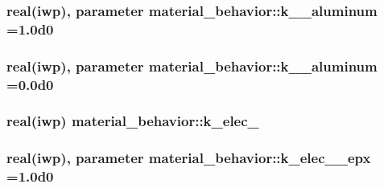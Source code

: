 \subsubsection[{k\+\_\+00\+\_\+aluminum}]{\setlength{\rightskip}{0pt plus 5cm}real(iwp), parameter material\+\_\+behavior\+::k\+\_\+\_\+aluminum =1.\+0d0}\label{classmaterial__behavior_a87bcf8ea95320967838eb79ea1185bcf}
\hypertarget{classmaterial__behavior_a3258f4bdb606bd94c11a8e59317d271d}{}
\subsubsection[{k\+\_\+01\+\_\+aluminum}]{\setlength{\rightskip}{0pt plus 5cm}real(iwp), parameter material\+\_\+behavior\+::k\+\_\+\_\+aluminum =0.\+0d0}\label{classmaterial__behavior_a3258f4bdb606bd94c11a8e59317d271d}
\hypertarget{classmaterial__behavior_a73beea5a2807ab8f6e15b990b7592486}{}
\subsubsection[{k\+\_\+elec\+\_\+00}]{\setlength{\rightskip}{0pt plus 5cm}real(iwp) material\+\_\+behavior\+::k\+\_\+elec\+\_}\label{classmaterial__behavior_a73beea5a2807ab8f6e15b990b7592486}
\hypertarget{classmaterial__behavior_ae6627960fae7dc38934722c9097db8e1}{}
\subsubsection[{k\+\_\+elec\+\_\+00\+\_\+epx}]{\setlength{\rightskip}{0pt plus 5cm}real(iwp), parameter material\+\_\+behavior\+::k\+\_\+elec\+\_\+\_\+epx =1.\+0d0}\label{classmaterial__behavior_ae6627960fae7dc38934722c9097db8e1}
\hypertarget{classmaterial__behavior_a94bfa8bcfa3df70aabe1615a9974c5a1}{}
